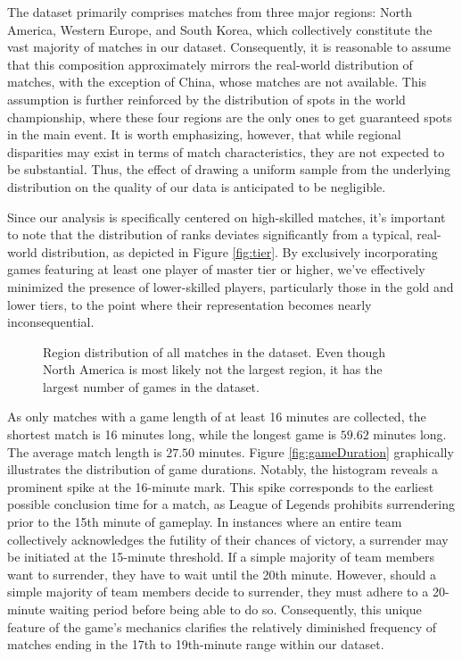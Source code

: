 \documentclass[12pt, a4paper, headinclude, twoside, plainheadsepline, open=right, numbers=noenddot, hidelinks, toc=listof, toc=bibliography]{scrreprt}
\begin{document}
The dataset primarily comprises matches from three major regions: North America, Western Europe, and South Korea, which collectively constitute the vast majority of matches in our dataset. 
Consequently, it is reasonable to assume that this composition approximately mirrors the real-world distribution of matches, with the exception of China, whose matches are not available.
This assumption is further reinforced by the distribution of spots in the world championship, where these four regions are the only ones to get guaranteed spots in the main event.
It is worth emphasizing, however, that while regional disparities may exist in terms of match characteristics, they are not expected to be substantial. Thus, the effect of drawing a uniform sample from the underlying distribution on the quality of our data is anticipated to be negligible.

Since our analysis is specifically centered on high-skilled matches, it's important to note that the distribution of ranks deviates significantly from a typical, real-world distribution, as depicted in Figure \ref{fig:tier}. 
By exclusively incorporating games featuring at least one player of master tier or higher, we've effectively minimized the presence of lower-skilled players, particularly those in the gold and lower tiers, to the point where their representation becomes nearly inconsequential.


\begin{figure}[ht]

\caption{Region distribution of all matches in the dataset. Even though North America is most likely not the largest region, it has the largest number of games in the dataset.}
\label{fig:platformId}
\end{figure}

As only matches with a game length of at least 16 minutes are collected, the shortest match is 16 minutes long, while the longest game is $59.62$ minutes long.
The average match length is $27.50$ minutes.
Figure \ref{fig:gameDuration} graphically illustrates the distribution of game durations. 
Notably, the histogram reveals a prominent spike at the 16-minute mark.
This spike corresponds to the earliest possible conclusion time for a match, as League of Legends prohibits surrendering prior to the 15th minute of gameplay. In instances where an entire team collectively acknowledges the futility of their chances of victory, a surrender may be initiated at the 15-minute threshold.
If a simple majority of team members want to surrender, they have to wait until the 20th minute.
However, should a simple majority of team members decide to surrender, they must adhere to a 20-minute waiting period before being able to do so. 
Consequently, this unique feature of the game's mechanics clarifies the relatively diminished frequency of matches ending in the 17th to 19th-minute range within our dataset.
\end{document}
